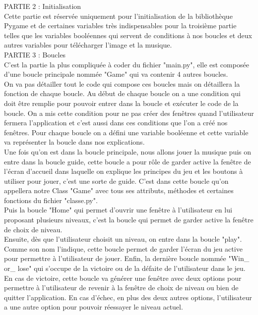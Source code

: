 \documentclass{article}
\begin{document}
					PARTIE 2 : Initialisation \\
					
Cette partie est réservée uniquement pour l'initialisation de la bibliothèque Pygame et de certaines variables très indispensables pour la troisième partie telles que les variables booléennes qui servent de conditions à nos boucles et deux autres variables pour télécharger l'image et la musique.\\

					PARTIE 3 : Boucles\\
					
C'est la partie la plus compliquée à coder du fichier "main.py", elle est composée d'une boucle principale nommée "Game" qui va contenir 4 autres boucles.\\
On va pas détailler tout le code qui compose ces boucles mais on détaillera la fonction de chaque boucle.
Au début de chaque boucle on a une condition qui doit être remplie pour pouvoir entrer dans la boucle et exécuter le code de la boucle. On a mis cette condition pour ne pas créer des fenêtres quand l'utilisateur fermera l'application et c'est aussi dans ces conditions que l'on a créé nos fenêtres.
Pour chaque boucle on a défini une variable booléenne et cette variable va représenter la boucle dans nos explications.\\
Une fois qu'on est dans la boucle principale, nous allons jouer la musique puis on entre dans la boucle guide, cette boucle a pour rôle de garder active la fenêtre de l'écran d'accueil dans laquelle on explique les principes du jeu et les boutons à utiliser pour jouer, c'est une sorte de guide. C'est dans cette boucle qu'on appellera notre Class "Game" avec tous ses attributs, méthodes et certaines fonctions du fichier "classe.py".\\
Puis la boucle "Home" qui permet d'ouvrir une fenêtre à l'utilisateur en lui proposant plusieurs niveaux, c'est la boucle qui permet de garder active la fenêtre de choix de niveau.\\
Ensuite, dès que l'utilisateur choisit un niveau, on entre dans la boucle "play". Comme son nom l'indique, cette boucle permet de garder l'écran du jeu active pour permettre à l'utilisateur de jouer.
Enfin, la dernière boucle nommée "Win\_ or\_ lose" qui s'occupe de la victoire ou de la défaite de l'utilisateur dans le jeu.\\
En cas de victoire, cette boucle va générer une fenêtre avec deux options pour permettre à l'utilisateur de revenir à la fenêtre de choix de niveau ou bien de quitter l'application.
En cas d'échec, en plus des deux autres options, l'utilisateur a une autre option pour pouvoir réessayer le niveau actuel.
\end{document}
